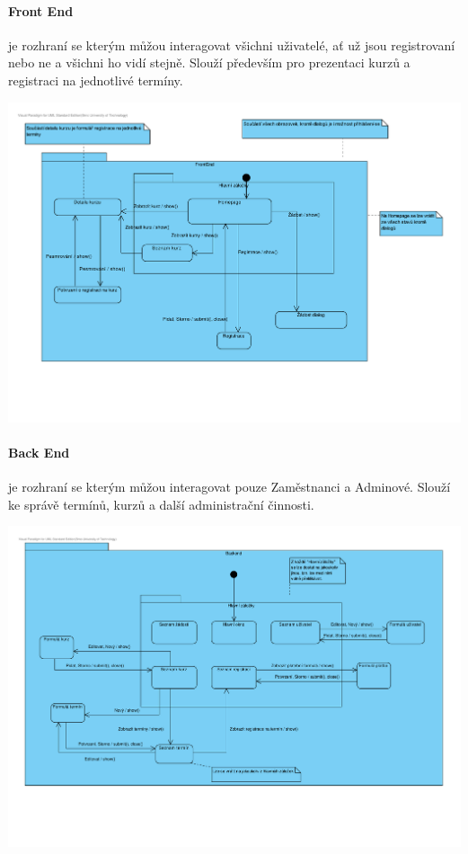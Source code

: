 \documentclass[12pt,a4paper,titlepage,final]{report}
\begin{document}
\paragraph{Front End} je rozhraní se kterým můžou interagovat všichni uživatelé, ať už jsou registrovaní nebo ne a všichni ho vidí stejně. Slouží především pro prezentaci kurzů a registraci na jednotlivé termíny.

\begin{center}
	\captionsetup{type=figure}
	\includegraphics[width=17cm]{img/frontend-obr.pdf}
\end{center}

\paragraph{Back End} je rozhraní se kterým můžou interagovat pouze Zaměstnanci a Adminové. Slouží ke správě termínů, kurzů a další administrační činnosti.

\begin{center}
	\captionsetup{type=figure}
	\includegraphics[width=17cm]{img/backend-obr.pdf}
\end{center}
		
\end{document}
